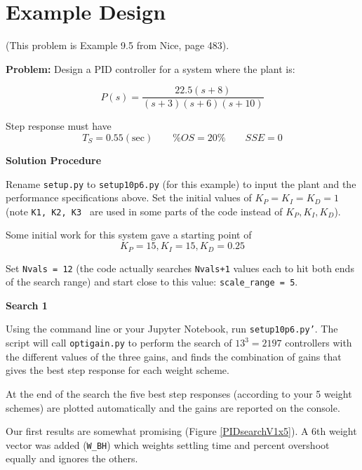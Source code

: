 \section{Example Design}


(This problem is Example 9.5 from Nice, page 483).


{\bf Problem: }
Design a PID controller for a system where the plant is:

\[
P(s) = \frac{22.5(s+8)}{(s+3)(s+6)(s+10)}
\]

Step response must have
\[
T_S = 0.55 \mathrm{(sec)} \qquad  \%OS = 20\% \qquad    SSE = 0
\]


{\bf Solution Procedure}

Rename {\tt setup.py} to {\tt setup10p6.py} (for this example)
to input the plant and the performance specifications above.
Set the initial values of $K_P= K_I=K_D=1$
(note {\tt K1, K2, K3 } are used in some parts of the
code instead of $K_P, K_I, K_D$).

Some initial work for this system gave a starting point of
 \[
 K_P = 15, K_I= 15, K_D=0.25
 \]

Set {\tt Nvals = 12}  (the code actually searches {\tt Nvals+1} values each to hit both ends of the
search range) and start close to this value: {\tt scale\_range = 5}.

{\bf Search 1}

Using the command line or your Jupyter Notebook, run {\tt setup10p6.py'}.
The script will call {\tt optigain.py} to perform the search of $13^3 = 2197$
controllers with the different values of the three gains, and finds the
combination of gains that gives the best step response for each weight scheme.

At the end of the search the five best step responses
(according to your 5 weight schemes)
are plotted automatically and the gains are reported on the console.

Our first results are somewhat promising (Figure \ref{PIDsearchV1x5}).
A 6th weight vector was added ({\tt W\_BH}) which weights settling time and percent overshoot
equally and ignores the others.

